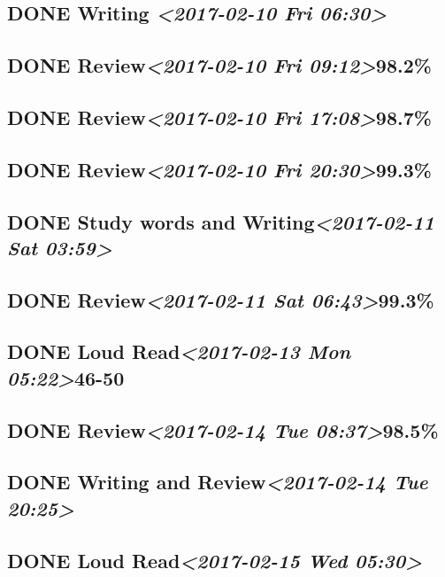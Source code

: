 \documentclass[11pt]{ctexart}
\begin{document}
\subsection{{\bfseries\sffamily DONE} Writing \textit{<2017-02-10 Fri 06:30>}}
\label{sec:org53757e5}
\subsection{{\bfseries\sffamily DONE} Review\textit{<2017-02-10 Fri 09:12>}98.2\%}
\label{sec:org86072d0}
\subsection{{\bfseries\sffamily DONE} Review\textit{<2017-02-10 Fri 17:08>}98.7\%}
\label{sec:org74ce79b}
\subsection{{\bfseries\sffamily DONE} Review\textit{<2017-02-10 Fri 20:30>}99.3\%}
\label{sec:org97a35cc}
\subsection{{\bfseries\sffamily DONE} Study words and Writing\textit{<2017-02-11 Sat 03:59>}}
\label{sec:org2c37c38}
\subsection{{\bfseries\sffamily DONE} Review\textit{<2017-02-11 Sat 06:43>}99.3\%}
\label{sec:org54c3207}
\subsection{{\bfseries\sffamily DONE} Loud Read\textit{<2017-02-13 Mon 05:22>}46-50}
\label{sec:org34c4d9c}
\subsection{{\bfseries\sffamily DONE} Review\textit{<2017-02-14 Tue 08:37>}98.5\%}
\label{sec:org63c653e}
\subsection{{\bfseries\sffamily DONE} Writing and Review\textit{<2017-02-14 Tue 20:25>}}
\label{sec:org5a709b8}
\subsection{{\bfseries\sffamily DONE} Loud Read\textit{<2017-02-15 Wed 05:30>}}
\label{sec:org1694fa5}
\end{document}

